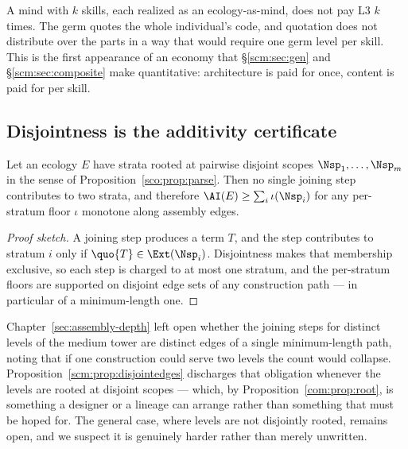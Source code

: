 \begin{remark}
\label{scm:rmk:oneg}
A mind with $k$ skills, each realized as an ecology-as-mind, does not pay
L3 $k$ times. The germ quotes the whole individual's code, and quotation
does not distribute over the parts in a way that would require one germ
level per skill. This is the first appearance of an economy that
\S\ref{scm:sec:gen} and \S\ref{scm:sec:composite} make quantitative:
architecture is paid for once, content is paid for per skill.
\end{remark}

\subsection{Disjointness is the additivity certificate}
\label{scm:sec:additive}

\begin{proposition}
\label{scm:prop:disjointedges}
Let an ecology $E$ have strata rooted at pairwise disjoint scopes $\Nsp_1,
\dots, \Nsp_m$ in the sense of Proposition~\ref{sco:prop:parse}. Then no
single joining step contributes to two strata, and therefore
$\AI(E) \ge \sum_i \iota(\Nsp_i)$ for any per-stratum floor $\iota$
monotone along assembly edges.
\end{proposition}

\begin{proof}[Proof sketch]
A joining step produces a term $T$, and the step contributes to stratum
$i$ only if $\quo{T} \in \Ext(\Nsp_i)$. Disjointness makes that membership
exclusive, so each step is charged to at most one stratum, and the
per-stratum floors are supported on disjoint edge sets of any construction
path --- in particular of a minimum-length one.
\end{proof}

\begin{remark}
\label{scm:rmk:obligation}
Chapter~\ref{sec:assembly-depth} left open whether the joining steps for
distinct levels of the medium tower are distinct edges of a single
minimum-length path, noting that if one construction could serve two
levels the count would collapse.
Proposition~\ref{scm:prop:disjointedges} discharges that obligation
whenever the levels are rooted at disjoint scopes --- which, by
Proposition~\ref{com:prop:root}, is something a designer or a lineage can
arrange rather than something that must be hoped for. The general case,
where levels are not disjointly rooted, remains open, and we suspect it is
genuinely harder rather than merely unwritten.
\end{remark}


